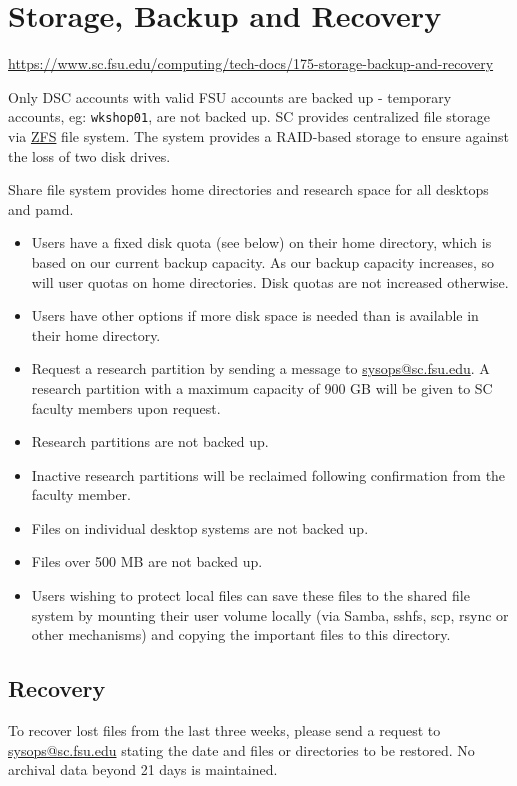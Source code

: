 \documentclass[12pt,a4paper]{article}
\begin{document}
\section{Storage, Backup and Recovery}
\url{https://www.sc.fsu.edu/computing/tech-docs/175-storage-backup-and-recovery}

Only DSC accounts with valid FSU accounts are backed up - temporary accounts, eg: \texttt{wkshop01}, are not backed up.
SC provides centralized file storage via \href{http://www.sun.com/software/solaris/zfs.jsp}{ZFS} file system. The system provides a RAID-based storage to ensure against the loss of two disk drives.

Share file system provides home directories and research space for all desktops and pamd.
\begin{itemize}
    \item Users have a fixed disk quota (see below) on their home directory, which is based on our current backup capacity. As our backup capacity increases, so will user quotas on home directories. Disk quotas are not increased otherwise.
    \item Users have other options if more disk space is needed than is available in their home directory.
    \item Request a research partition by sending a message to \href{mailto:sysops@sc.fsu.edu}{sysops@sc.fsu.edu}. A research partition with a maximum capacity of 900 GB will be given to SC faculty members upon request.
    \item Research partitions are not backed up.
    \item Inactive research partitions will be reclaimed following confirmation from the faculty member.
    \item Files on individual desktop systems are not backed up.
    \item Files over 500 MB are not backed up.
    \item Users wishing to protect local files can save these files to the shared file system by mounting their user volume locally (via Samba, sshfs, scp, rsync or other mechanisms) and copying the important files to this directory.
\end{itemize}

\subsection*{Recovery}
To recover lost files from the last three weeks, please send a request to \href{mailto:sysops@sc.fsu.edu}{sysops@sc.fsu.edu} stating the date and files or directories to be restored.
No archival data beyond 21 days is maintained.
\end{document}
